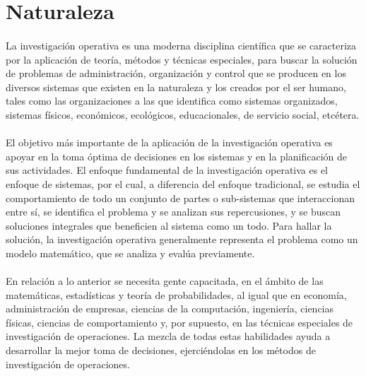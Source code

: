 \documentclass[12pt, a4paper,spanish]{article}
\begin{document}
	\section{Naturaleza}
		\paragraph{}
		La investigación operativa es una moderna disciplina científica que se caracteriza por la aplicación de teoría, métodos y técnicas especiales, para buscar la solución de problemas de administración, organización y control que se producen en los diversos sistemas que existen en la naturaleza y los creados por el ser humano, tales como las organizaciones a las que identifica como sistemas organizados, sistemas físicos, económicos, ecológicos, educacionales, de servicio social, etcétera.\cite{wikipedia_IO}

		\paragraph{}
		El objetivo más importante de la aplicación de la investigación operativa es apoyar en la toma óptima de decisiones en los sistemas y en la planificación de sus actividades. El enfoque fundamental de la investigación operativa es el enfoque de sistemas, por el cual, a diferencia del enfoque tradicional, se estudia el comportamiento de todo un conjunto de partes o sub-sistemas que interaccionan entre sí, se identifica el problema y se analizan sus repercusiones, y se buscan soluciones integrales que beneficien al sistema como un todo. Para hallar la solución, la investigación operativa generalmente representa el problema como un modelo matemático, que se analiza y evalúa previamente.\cite{wikipedia_IO}

		\paragraph{}
		En relación a lo anterior se necesita gente capacitada, en el ámbito de las matemáticas, estadísticas y teoría de probabilidades, al igual que en economía, administración de empresas, ciencias de la computación, ingeniería, ciencias físicas, ciencias de comportamiento y, por supuesto, en las técnicas especiales de investigación de operaciones. La mezcla de todas estas habilidades ayuda a desarrollar la mejor toma de decisiones, ejerciéndolas en los métodos de investigación de operaciones.\cite{gestiopolis_IO}
\end{document}
